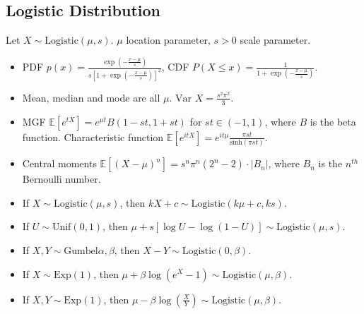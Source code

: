 \documentclass[twoside]{article}
\newcommand{\dis}{\displaystyle}
\newcommand\bbE{\mathbb{E}}
\newcommand\var{\text{Var }}
\begin{document}
\subsection{Logistic Distribution}
Let $X \sim \text{Logistic}(\mu, s)$. $\mu$ location parameter, $s > 0$ scale parameter.

\begin{itemize}
\item PDF $p(x) = \dis\frac{\exp \left(-\frac{x-\mu}{s} \right)}{s \left[1 + \exp \left(-\frac{x-\mu}{s} \right) \right]^2}$, CDF $P(X \leq x) = \dis\frac{1}{1 + \exp \left(-\frac{x-\mu}{s} \right)}$.

\item Mean, median and mode are all $\mu$. $\var X = \dis\frac{s^2 \pi^2}{3}$.

\item MGF $\bbE [e^{tX}] = e^{\mu t} B(1 - st, 1 + st)$ for $st \in (-1, 1)$, where $B$ is the beta function. Characteristic function $\bbE [e^{itX}] = e^{it \mu} \dis\frac{\pi st}{\text{sinh}(\pi st)}$.

\item Central moments $\bbE [(X-\mu)^n] = s^n \pi^n (2^n - 2) \cdot |B_n|$, where $B_n$ is the $n^{th}$ Bernoulli number.

\item If $X \sim \text{Logistic}(\mu, s)$, then $kX + c \sim \text{Logistic}(k\mu + c, ks)$.

\item If $U \sim \text{Unif}(0,1)$, then $\mu + s[\log U - \log (1-U)] \sim \text{Logistic}(\mu, s)$.

\item If $X, Y \sim \text{Gumbel}{\alpha, \beta}$, then $X - Y \sim \text{Logistic}(0, \beta)$.

\item If $X \sim \text{Exp}(1)$, then $\mu + \beta \log(e^X - 1) \sim \text{Logistic}(\mu, \beta)$.

\item If $X, Y \sim \text{Exp}(1)$, then $\mu - \beta \log \left(\dis\frac{X}{Y} \right) \sim \text{Logistic}(\mu, \beta)$.
\end{itemize}

\end{document}
